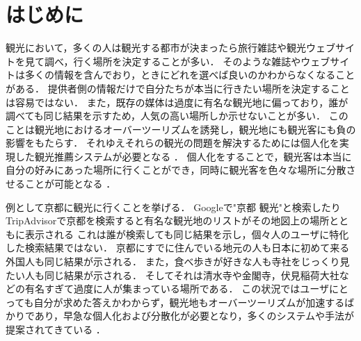 \documentclass[a4j,10pt, twocolumn]{jarticle}
\begin{document}


\section{はじめに} \label{introduction}
観光において，多くの人は観光する都市が決まったら旅行雑誌や観光ウェブサイトを見て調べ，行く場所を決定することが多い．
そのような雑誌やウェブサイトは多くの情報を含んでおり，ときにどれを選べば良いのかわからなくなることがある．
提供者側の情報だけで自分たちが本当に行きたい場所を決定することは容易ではない．
また，既存の媒体は過度に有名な観光地に偏っており，誰が調べても同じ結果を示すため，人気の高い場所しか示せないことが多い．
このことは観光地におけるオーバーツーリズムを誘発し，観光地にも観光客にも負の影響をもたらす．
それゆえそれらの観光の問題を解決するためには個人化を実現した観光推薦システムが必要となる\cite{ma2017} \cite{ma2019}．
個人化をすることで，観光客は本当に自分の好みにあった場所に行くことができ，同時に観光客を色々な場所に分散させることが可能となる\cite{ma2017} \cite{ma2019}．

例として京都に観光に行くことを挙げる．
Googleで"京都 観光"と検索したりTripAdvisorで京都を検索すると有名な観光地のリストがその地図上の場所とともに表示される
これは誰が検索しても同じ結果を示し，個々人のユーザに特化した検索結果ではない．
京都にすでに住んでいる地元の人も日本に初めて来る外国人も同じ結果が示される．
また，食べ歩きが好きな人も寺社をじっくり見たい人も同じ結果が示される．
そしてそれは清水寺や金閣寺，伏見稲荷大社などの有名すぎて過度に人が集まっている場所である．
この状況ではユーザにとっても自分が求めた答えかわからず，観光地もオーバーツーリズムが加速するばかりであり，早急な個人化および分散化が必要となり，多くのシステムや手法が提案されてきている\cite{ma2017} \cite{ma2019}．
\end{document}
